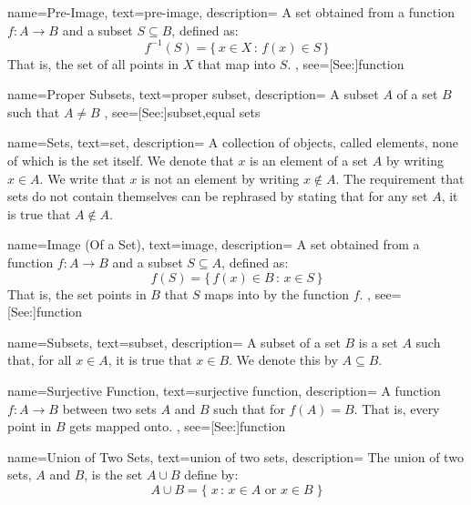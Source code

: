 {
    name={Pre-Image},
    text={pre-image},
    description={
        A set obtained from a function $f:A\rightarrow{B}$
        and a subset $S\subseteq{B}$, defined as:
        \begin{equation*}
            f^{\minus{1}}(S)=\{\,x\in{X}\,:\,f(x)\in{S}\,\}
        \end{equation*}
        That is, the set of all points in $X$ that map into $S$.
    },
    see=[See:]{function}
}

{
    name={Proper Subsets},
    text={proper subset},
    description={
        A subset $A$ of a set $B$ such that $A\ne{B}$
    },
    see=[See:]{subset,equal sets}
}

{
    name={Sets},
    text={set},
    description={
        A collection of objects, called elements, none of which is the set
        itself. We denote that $x$ is an element of a set $A$ by writing
        $x\in{A}$. We write that $x$ is not an element by writing
        $x\notin{A}$. The requirement that sets do not contain themselves can
        be rephrased by stating that for any set $A$, it is true that
        $A\notin{A}$.
    }
}

{
    name={Image (Of a Set)},
    text={image},
    description={
        A set obtained from a function $f:A\rightarrow{B}$
        and a subset $S\subseteq{A}$, defined as:
        \begin{equation*}
            f(S)=\{\,f(x)\in{B}\,:\,x\in{S}\,\}
        \end{equation*}
        That is, the set points in $B$ that $S$ maps into by the function $f$.
    },
    see=[See:]{function}
}

{
    name={Subsets},
    text={subset},
    description={
        A subset of a set $B$ is a set $A$ such that, for all $x\in{A}$, it is
        true that $x\in{B}$. We denote this by $A\subseteq{B}$.
    }
}

{
    name={Surjective Function},
    text={surjective function},
    description={
        A function $f:A\rightarrow{B}$ between two sets $A$ and $B$ such that
        for $f(A)=B$. That is, every point in $B$ gets mapped onto.
    },
    see=[See:]{function}
}

{
    name={Union of Two Sets},
    text={union of two sets},
    description={
        The union of two sets, $A$ and $B$, is the set $A\cup{B}$ define by:
        \begin{equation}
            A\cup{B}=\{\;x\,:\,x\in{A}\textrm{ or }x\in{B}\;\}
        \end{equation}
    }
}


